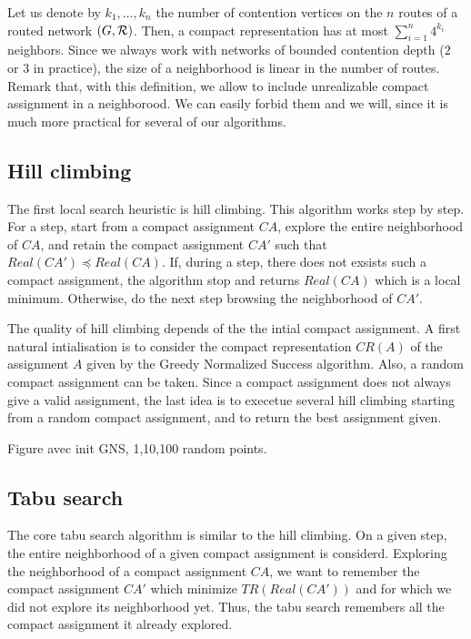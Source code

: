 \documentclass[english]{article}
\begin{document}
 Let us denote by $k_1,\ldots,k_n$ the number of contention vertices on the $n$ routes of 
 a routed network $(G,\cal{R})$. Then, a compact representation has at most $\sum_{i=1}^n 4^{k_i}$ neighbors. Since we always work with networks of bounded contention depth ($2$ or $3$ in practice), the size of a neighborhood is linear in the number of routes.
 Remark that, with this definition, we allow to include unrealizable compact assignment in a neighborood. We can easily forbid them and we will, since it is much more practical for several of our algorithms. 
\subsection{Hill climbing}
The first local search heuristic is hill climbing. This algorithm works step by step. For a step, start from a compact assignment $CA$, explore the entire neighborhood of $CA$, and retain the compact assignment $CA'$ such that $ Real(CA')\preceq Real(CA)$. If, during a step, there does not exsists such a compact assignment, the algorithm stop and returns $Real(CA)$ which is a local minimum. Otherwise, do the next step browsing the neighborhood of $CA'$.

The quality of hill climbing depends of the the intial compact assignment. A first natural intialisation is to consider the compact representation $CR(A)$ of the assignment $A$ given by the Greedy Normalized Success algorithm. Also, a random compact assignment can be taken. Since a compact assignment does not always give a valid assignment, the last idea is to execetue several hill climbing starting from a random compact assignment, and to return the best assignment given.

Figure avec init GNS, 1,10,100 random points.

\subsection{Tabu search}
The core tabu search algorithm is similar to the hill climbing. On a given step, the entire neighborhood of a given compact assignment is considerd. Exploring the neighborhood of a compact assignment $CA$, we want to remember the compact assignment $CA'$ which minimize $TR(Real(CA'))$ and for which we did not explore its neighborhood yet. Thus, the tabu search remembers all the compact assignment it already explored.
\end{document}
